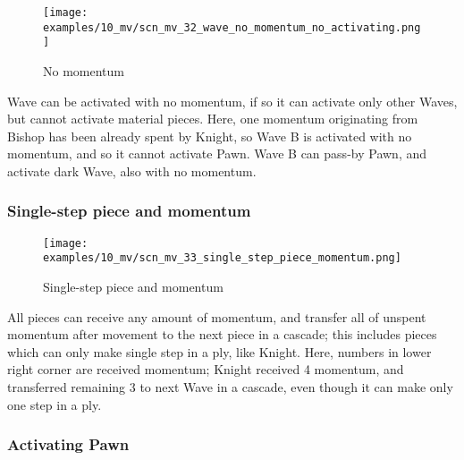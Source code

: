 \vspace*{-1.4\baselineskip}
\noindent
\begin{figure}[h]
\texttt{[image: examples/10\_mv/scn\_mv\_32\_wave\_no\_momentum\_no\_activating.png]}
\caption{No momentum}
\label{fig:scn_mv_32_wave_no_momentum_no_activating}
\end{figure}

Wave can be activated with no momentum, if so it can activate only other Waves, but
cannot activate material pieces. Here, one momentum originating from Bishop has been
already spent by Knight, so Wave B is activated with no momentum, and so it cannot
activate Pawn. Wave B can pass-by Pawn, and activate dark Wave, also with no momentum.

\clearpage %

\subsubsection*{Single-step piece and momentum}
\label{sec:Miranda's veil/Wave/Cascading Waves/Single-step piece and momentum}

\vspace*{-1.5\baselineskip}
\noindent
\begin{figure}[h]
\texttt{[image: examples/10\_mv/scn\_mv\_33\_single\_step\_piece\_momentum.png]}
\vspace*{-1.4\baselineskip}
\caption{Single-step piece and momentum}
\label{fig:scn_mv_33_single_step_piece_momentum}
\end{figure}

\vspace*{-0.5\baselineskip}
All pieces can receive any amount of momentum, and transfer all of unspent momentum
after movement to the next piece in a cascade; this includes pieces which can only
make single step in a ply, like Knight. \newline
\indent
Here, numbers in lower right corner are received momentum; Knight received 4 momentum,
and transferred remaining 3 to next Wave in a cascade, even though it can make only one
step in a ply.

\clearpage %

\subsubsection*{Activating Pawn}
\label{sec:Miranda's veil/Wave/Cascading Waves/Activating Pawn}

